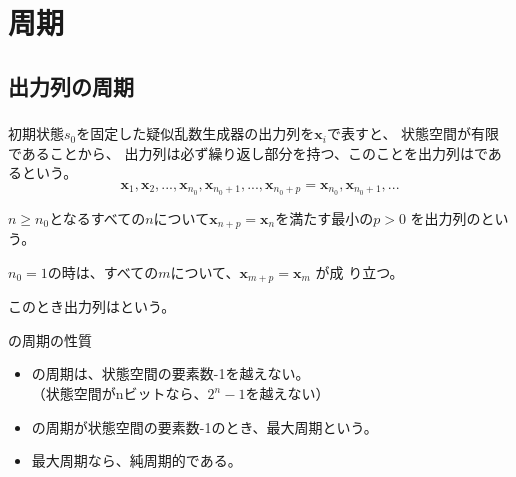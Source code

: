 \documentclass[cjk, dvips, xcolor=dvipsnames, hyperref={bookmarks=false}]{beamer}
\def\bx{{{\mathbf x}}}
\begin{document}
\section{周期}
\subsection{出力列の周期}
\begin{frame}[t]
  \frametitle{\insertsubsection}
  初期状態$s_0$を固定した疑似乱数生成器の出力列を$\bx_i$で表すと、
  状態空間が有限であることから、
  出力列は必ず繰り返し部分を持つ、このことを出力列はであるという。
  \[
  \bx_1, \bx_2, ..., \bx_{n_0}, \bx_{n_0 + 1}, ..., \bx_{n_0 + p} = \bx_{n_0},
  \bx_{n_0+1}, ...
  \]

  \pause
  $n \ge n_0$となるすべての$n$について$\bx_{n + p} = \bx_{n}$を満たす最小の$p > 0$
  を出力列のという。

  \pause
  $n_0 = 1$の時は、すべての$m$について、$\bx_{m + p} = \bx_m$ が成
  り立つ。

  このとき出力列はという。

  \pause
  \begin{block}{\FLPRNG の周期の性質}
    \begin{itemize}
    \item \FLPRNG の周期は、状態空間の要素数-1を越えない。\\
      （状態空間がnビットなら、$2^n-1$を越えない）
    \item \FLPRNG の周期が状態空間の要素数-1のとき、最大周期という。
    \item 最大周期なら、純周期的である。
    \end{itemize}
  \end{block}
\end{frame}
\end{document}
